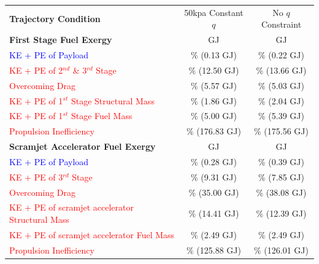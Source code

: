 \begin{table}[ht] %
	\centering
	\begin{tabular}{l c c} 
		\hline \textbf{Trajectory Condition}
		&50kpa Constant $q$
		&No $q$ Constraint
		\\
		\textbf{First Stage Fuel Exergy} 
		&\textbf{\firstEnergyConstqNoReturn} GJ
		&\textbf{\firstEnergyStandardNoReturn} GJ
		\\
		
		\textcolor{blue}{KE + PE of Payload}
		& \firstWpayloadConstqNoReturn \% (0.13 GJ)
		& \firstWpayloadStandardNoReturn \% (0.22 GJ)
		\\
		\textcolor{red}{KE + PE of  2$^{nd}$ \& 3$^{rd}$ Stage}
		& \firstWnextStageConstqNoReturn \% (12.50 GJ) & \firstWnextStageStandardNoReturn \% (13.66 GJ)
		\\
		
		\textcolor{red}{Overcoming Drag} 
		& \WDoneConstqNoReturn \% (5.57 GJ) & \WDoneStandardNoReturn \% (5.03 GJ)
		\\
		\textcolor{red}{KE + PE of 1$^{st}$ Stage Structural Mass} 
		& \WoneConstqNoReturn \% (1.86 GJ) & \WoneStandardNoReturn \% (2.04 GJ)
		\\ 
		\textcolor{red}{KE + PE of 1$^{st}$ Stage Fuel Mass} 
		& \WmFoneConstqNoReturn \% (5.00 GJ) & \WmFoneStandardNoReturn \% (5.39 GJ)
		\\ 
		\textcolor{red}{Propulsion Inefficiency} 
		& \PlossoneConstqNoReturn \% (176.83 GJ) & \PlossoneStandardNoReturn \% (175.56 GJ)
		\\ 
		\textbf{Scramjet Accelerator Fuel Exergy} 
		& \textbf{\secondEnergyConstqNoReturn} GJ & \textbf{\secondEnergyStandardNoReturn} GJ
		\\
		\textcolor{blue}{KE + PE of Payload}
		& \secondWpayloadConstqNoReturn \% (0.28 GJ) & \secondWpayloadStandardNoReturn \% (0.39 GJ) 
		\\
		\textcolor{red}{KE + PE of 3$^{rd}$ Stage}
		& \secondWnextStageConstqNoReturn \% (9.31 GJ) & \secondWnextStageStandardNoReturn \% (7.85 GJ)
		\\
		\textcolor{red}{Overcoming Drag}
		& \WDsecondConstqNoReturn \% (35.00 GJ) & \WDsecondStandardNoReturn \% (38.08 GJ)
		\\
		\textcolor{red}{KE + PE of scramjet accelerator Structural Mass}  
		& \WsecondConstqNoReturn \% (14.41 GJ) & \WsecondStandardNoReturn \% (12.39 GJ)
		\\
		\textcolor{red}{KE + PE of scramjet accelerator Fuel Mass}  
		& \WmFsecondConstqNoReturn \% (2.49 GJ) & \WmFsecondStandardNoReturn \% (2.49 GJ)
		\\
		\textcolor{red}{Propulsion Inefficiency}  
		& \PlosssecondConstqNoReturn \% (125.88 GJ) & \PlosssecondStandardNoReturn \% (126.01 GJ)
		\\
		

\end{tabular}
\end{table}
